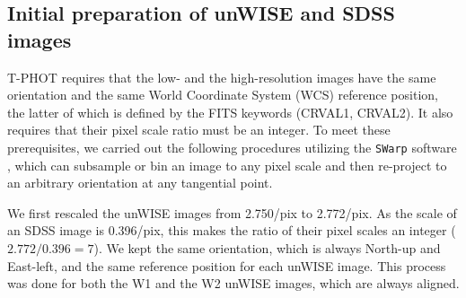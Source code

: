 \documentclass[apj,iop]{emulateapj}
\begin{document}
\subsection{Initial preparation of unWISE and SDSS images} 



T-PHOT requires that the low- and the high-resolution images have the same orientation and the same World Coordinate System (WCS) reference position, the latter of which is defined by the FITS keywords (CRVAL1, CRVAL2). %
It also requires that their pixel scale ratio must be an integer. To meet these prerequisites, we carried out the following procedures utilizing the {\tt SWarp} software \citep[][]{Bertin2002}, which can subsample or bin an image to any pixel scale and then re-project to an arbitrary orientation at any tangential point.

We first rescaled the unWISE images from 2.750\arcsec/pix to 2.772\arcsec/pix. As the scale of an SDSS image is 0.396\arcsec/pix, this makes the ratio of their pixel scales an integer ($2.772/0.396=7$). We kept the same orientation, which is always North-up and East-left, and the same reference position for each unWISE image. This process was done for both the W1 and the W2 unWISE images, which are always aligned.
\end{document}

